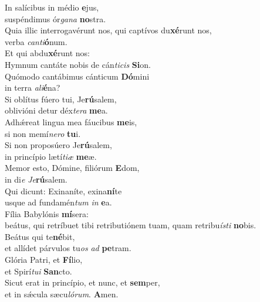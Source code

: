 \evenverse In salícibus in médio \textbf{e}jus,~\*\\
\evenverse suspéndimus ór\textit{ga}\textit{na} \textbf{no}stra.\\
\oddverse Quia illic interrogavérunt nos, qui captívos du\textbf{xé}runt nos,~\*\\
\oddverse verba \textit{can}\textit{ti}\textbf{ó}num.\\
\evenverse Et qui abdu\textbf{xé}runt nos:~\*\\
\evenverse Hymnum cantáte nobis de cán\textit{ti}\textit{cis} \textbf{Si}on.\\
\oddverse Quómodo cantábimus cánticum \textbf{Dó}mini~\*\\
\oddverse in terra \textit{a}\textit{li}\textbf{é}na?\\
\evenverse Si oblítus fúero tui, Je\textbf{rú}salem,~\*\\
\evenverse oblivióni detur déx\textit{te}\textit{ra} \textbf{me}a.\\
\oddverse Adhǽreat lingua mea fáucibus \textbf{me}is,~\*\\
\oddverse si non memí\textit{ne}\textit{ro} \textbf{tu}i.\\
\evenverse Si non proposúero Je\textbf{rú}salem,~\*\\
\evenverse in princípio lætí\textit{ti}\textit{æ} \textbf{me}æ.\\
\oddverse Memor esto, Dómine, filiórum \textbf{E}dom,~\*\\
\oddverse in di\textit{e} \textit{Je}\textbf{rú}salem.\\
\evenverse Qui dicunt: Exinaníte, exina\textbf{ní}te~\*\\
\evenverse usque ad fundamén\textit{tum} \textit{in} \textbf{e}a.\\
\oddverse Fília Babylónis \textbf{mí}sera:~\*\\
\oddverse beátus, qui retríbuet tibi retributiónem tuam, quam retribu\textit{í}\textit{sti} \textbf{no}bis.\\
\evenverse Beátus qui te\textbf{né}bit,~\*\\
\evenverse et allídet párvulos tu\textit{os} \textit{ad} \textbf{pe}tram.\\
\oddverse Glória Patri, et \textbf{Fí}lio,~\*\\
\oddverse et Spirí\textit{tu}\textit{i} \textbf{San}cto.\\
\evenverse Sicut erat in princípio, et nunc, et \textbf{sem}per,~\*\\
\evenverse et in sǽcula sæcu\textit{ló}\textit{rum}. \textbf{A}men.\\

